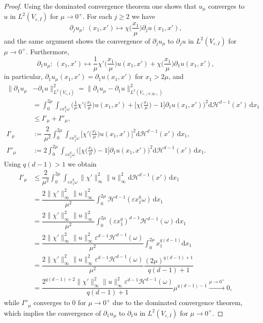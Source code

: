 \documentclass[11pt,oneside,reqno,a4paper]{amsart}
\newcommand{\dd}{\mathrm{d}}
\renewcommand{\H}{\mathcal{H}}
\newcommand{\eps}{\varepsilon}
\theoremstyle{definition}
\begin{document}
\begin{proof}
Using the dominated convergence theorem one shows that
$u_\mu$ converges to $u$ in $L^2(V_{\eps,I})$ for $\mu\to 0^+$.
For each $j\ge 2$ we have
\[
\partial_j u_\mu:\ (x_1,x')\mapsto \chi\Big(\frac{x_1}{\mu}\Big)\partial_j u(x_1,x'),
\]
and the same argument shows the convergence of $\partial_j u_\mu$ to $\partial_j u$ in $L^2(V_{\eps,I})$ for $\mu\to 0^+$. Furthermore,
\[
\partial_1 u_\mu:\ (x_1,x')\mapsto \frac{1}{\mu}\chi'\Big(\frac{x_1}{\mu}\Big)u(x_1,x')
+ \chi\Big(\frac{x_1}{\mu}\Big)\partial_1 u(x_1,x'),
\]
in particular, $\partial_1 u_\mu(x_1,x')=\partial_1 u(x_1,x')$ for $x_1>2\mu$, and
\begin{align*}
\|\partial_1 u_\mu&-\partial_1 u\|^2_{L^2(V_{\eps,I})}=	\|\partial_1 u_\mu-\partial_1 u\|^2_{L^2(V_{\eps,(0,2\mu)})}\\
&=\int_0^{2\mu} \int_{\eps x_1^q \omega}\bigg(\frac{1}{\mu}\chi'\Big(\frac{x_1}{\mu}\Big)u(x_1,x')
+ \Big[\chi\Big(\frac{x_1}{\mu}\Big)-1\Big]\partial_1 u(x_1,x')\bigg)^2\dd \H^{d-1}(x')\,\dd x_1\\
&\le I'_\mu+I''_\mu,\\
I'_\mu&:=\dfrac{2}{\mu^2}\int_0^{2\mu} \int_{\eps x_1^q \omega} \Big[\chi'\Big(\frac{x_1}{\mu}\Big)u(x_1,x')\Big]^2\dd \H^{d-1}(x')\,\dd x_1,\\
I''_\mu&:=2\int_0^{2\mu} \int_{\eps x_1^q \omega}
\bigg(\Big[\chi\Big(\frac{x_1}{\mu}\Big)-1\Big]\partial_1 u(x_1,x')\bigg)^2\dd \H^{d-1}(x')\,\dd x_1.
\end{align*}
Using $q(d-1)>1$ we obtain
\begin{align*}
I'_\mu&\le \dfrac{2}{\mu^2}\int_0^{2\mu} \int_{\eps x_1^q \omega} \|\chi'\|_\infty^2 \|u\|_\infty^2\dd \H^{d-1}(x')\,\dd x_1\\
&=\dfrac{2 \|\chi'\|_\infty^2 \|u\|_\infty^2}{\mu^2} \int_0^{2\mu} \H^{d-1}(\eps x_1^q \omega) \,\dd x_1\\
&=\dfrac{2 \|\chi'\|_\infty^2 \|u\|_\infty^2}{\mu^2} \int_0^{2\mu} (\eps x_1^q)^{d-1}\H^{d-1}(\omega)\,\dd x_1\\
&=\dfrac{2 \|\chi'\|_\infty^2 \|u\|_\infty^2\eps^{d-1} \H^{d-1}(\omega)}{\mu^2} \int_0^{2\mu} x_1^{q(d-1)}\dd x_1\\
&=\dfrac{2 \|\chi'\|_\infty^2 \|u\|_\infty^2\eps^{d-1} \H^{d-1}(\omega)}{\mu^2} \dfrac{(2\mu)^{q(d-1)+1}}{q(d-1)+1}\\
&=\dfrac{2^{q(d-1)+2} \|\chi'\|_\infty^2 \|u\|_\infty^2\eps^{d-1} \H^{d-1}(\omega)}{q(d-1)+1} \mu^{q(d-1)-1}\xrightarrow{\mu\to 0^+}0,
\end{align*}
while $I''_\mu$ converges to $0$ for $\mu\to 0^+$ due to the dominated convergence theorem,
which implies the convergence of $\partial_1 u_\mu$ to $\partial_1 u$ in $L^2(V_{\eps,I})$ for $\mu\to 0^+$.
\end{proof}
\end{document}
